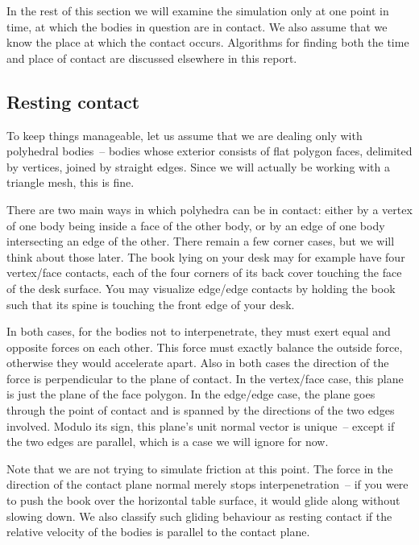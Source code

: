 In the rest of this section we will examine the simulation only at one point in time, at which
the bodies in question are in contact. We also assume that we know the place at which the contact
occurs. Algorithms for finding both the time and place of contact are discussed elsewhere in this
report.

\subsection{Resting contact\label{restingContact}}

To keep things manageable, let us assume that we are dealing only with polyhedral bodies~-- bodies
whose exterior consists of flat polygon faces, delimited by vertices, joined by straight edges.
Since we will actually be working with a triangle mesh, this is fine.

There are two main ways in which polyhedra can be in contact: either by a vertex of one body being
inside a face of the other body, or by an edge of one body intersecting an edge of the other.
There remain a few corner cases, but we will think about those later. The book lying on your desk
may for example have four vertex/face contacts, each of the four corners of its back cover
touching the face of the desk surface. You may visualize edge/edge contacts by holding the book
such that its spine is touching the front edge of your desk.

In both cases, for the bodies not to interpenetrate, they must exert equal and opposite forces on
each other. This force must exactly balance the outside force, otherwise they would accelerate
apart. Also in both cases the direction of the force is perpendicular to the plane of contact. In
the vertex/face case, this plane is just the plane of the face polygon. In the edge/edge case, the
plane goes through the point of contact and is spanned by the directions of the two edges involved.
Modulo its sign, this plane's unit normal vector is unique~-- except if the two edges are
parallel, which is a case we will ignore for now.

Note that we are not trying to simulate friction at this point. The force in the direction of the
contact plane normal merely stops interpenetration~-- if you were to push the book over the
horizontal table surface, it would glide along without slowing down. We also classify such gliding
behaviour as resting contact if the relative velocity of the bodies is parallel to the contact
plane.

